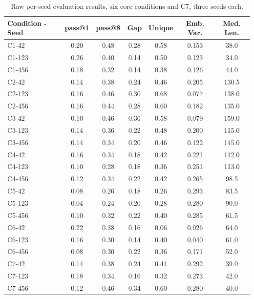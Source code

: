 \documentclass{article}
\begin{document}
\begin{table}[h]
\centering
\caption{Raw per-seed evaluation results, six core conditions and C7, three seeds each.}
\label{tab:raw}
\small
\begin{tabular}{lcccccc}
\toprule
\textbf{Condition - Seed} & \textbf{pass@1} & \textbf{pass@8} & \textbf{Gap} & \textbf{Unique} & \textbf{Emb. Var.} & \textbf{Med. Len.} \\
\midrule
C1-42  & 0.20 & 0.48 & 0.28 & 0.58 & 0.153 & 38.0 \\
C1-123 & 0.26 & 0.40 & 0.14 & 0.50 & 0.123 & 34.0 \\
C1-456 & 0.18 & 0.32 & 0.14 & 0.38 & 0.126 & 44.0 \\
\midrule
C2-42  & 0.14 & 0.38 & 0.24 & 0.46 & 0.205 & 130.5 \\
C2-123 & 0.16 & 0.46 & 0.30 & 0.68 & 0.077 & 138.0 \\
C2-456 & 0.16 & 0.44 & 0.28 & 0.60 & 0.182 & 135.0 \\
\midrule
C3-42  & 0.10 & 0.46 & 0.36 & 0.58 & 0.079 & 159.0 \\
C3-123 & 0.14 & 0.36 & 0.22 & 0.48 & 0.200 & 115.0 \\
C3-456 & 0.14 & 0.34 & 0.20 & 0.46 & 0.122 & 145.0 \\
\midrule
C4-42  & 0.16 & 0.34 & 0.18 & 0.42 & 0.221 & 112.0 \\
C4-123 & 0.10 & 0.28 & 0.18 & 0.36 & 0.251 & 113.0 \\
C4-456 & 0.12 & 0.34 & 0.22 & 0.42 & 0.265 & 98.5 \\
\midrule
C5-42  & 0.08 & 0.26 & 0.18 & 0.26 & 0.293 & 83.5 \\
C5-123 & 0.04 & 0.24 & 0.20 & 0.28 & 0.280 & 90.0 \\
C5-456 & 0.10 & 0.32 & 0.22 & 0.40 & 0.285 & 61.5 \\
\midrule
C6-42  & 0.22 & 0.38 & 0.16 & 0.06 & 0.026 & 64.0 \\
C6-123 & 0.16 & 0.30 & 0.14 & 0.40 & 0.040 & 61.0 \\
C6-456 & 0.08 & 0.30 & 0.22 & 0.36 & 0.171 & 52.0 \\
\midrule
C7-42  & 0.14 & 0.38 & 0.24 & 0.44 & 0.292 & 39.0 \\
C7-123 & 0.18 & 0.34 & 0.16 & 0.32 & 0.273 & 42.0 \\
C7-456 & 0.12 & 0.46 & 0.34 & 0.60 & 0.280 & 40.0 \\
\bottomrule
\end{tabular}
\end{table}
\end{document}
